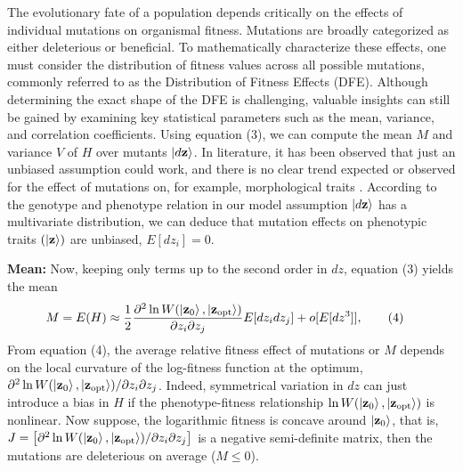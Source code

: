 \documentclass[11pt]{article}
\begin{document}
The evolutionary fate of a population depends critically on the effects of individual mutations on organismal fitness. Mutations are broadly categorized as either deleterious or beneficial. To mathematically characterize these effects, one must consider the distribution of fitness values across all possible mutations, commonly referred to as the Distribution of Fitness Effects (DFE). Although determining the exact shape of the DFE is challenging, valuable insights can still be gained by examining key statistical parameters such as the mean, variance, and correlation coefficients. Using equation (3), we can compute the mean \(  M \)  and variance \(  V \)  of \( H \) over mutants \( \ket{d\mathbf{z}} \). In literature, it has been observed that just an unbiased assumption could work, and there is no clear trend expected or observed for the effect of mutations on, for example, morphological traits \cite{martin2006general}. According to the genotype and phenotype relation in our model assumption $\ket{d\mathbf{z}}$ has a multivariate distribution, we can deduce that mutation effects on phenotypic traits \( (\ket{\mathbf{z}}) \) are unbiased, \( E[dz_i] = 0 \). 

\textbf{Mean:} Now, keeping only terms up to the second order in \(dz\), equation (3) yields the mean
\begin{align}
 M = E(H) &\approx \frac{1}{2} \frac{\partial^2 \ln W(\ket{\mathbf{z}_0}, \ket{\mathbf{z}_{\mathrm{opt}}})}{\partial z_i \partial z_j} E[dz_i dz_j] + o[E[dz^3]], \tag{4} 
\end{align}
From equation (4), the average relative fitness effect of mutations or \( M \) depends on the local curvature of the log-fitness function at the optimum, \(\partial^2 \ln W(\ket{\mathbf{z}_0}, \ket{\mathbf{z}_{\mathrm{opt}}})/\partial z_i \partial z_j\). Indeed, symmetrical variation in \(dz\) can just introduce a bias in \(H\) if the phenotype-fitness relationship \(\ln W(\ket{\mathbf{z}_0}, \ket{\mathbf{z}_{\mathrm{opt}}}) \) is nonlinear. 
Now suppose, the logarithmic fitness is concave around \(\ket{\mathbf{z}_0}\), that is, \( J = \big[ \partial^2 \ln W(\ket{\mathbf{z}_0}, \ket{\mathbf{z}_{\mathrm{opt}}})/\partial z_i \partial z_j \big]\) is a negative semi-definite matrix, then the mutations are deleterious on average (\( M \leq 0\)). 
\end{document}

